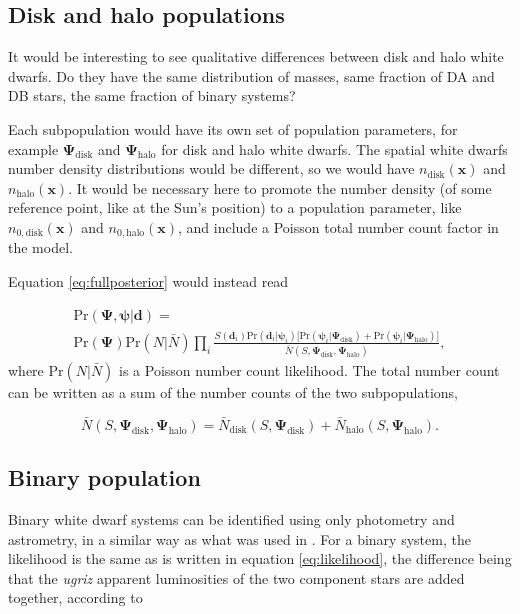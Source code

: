 \documentclass[fleqn,usenatbib]{mnras}
\newcommand{\popp}{\boldsymbol{\Psi}}
\newcommand{\objp}{\boldsymbol{\psi}}
\newcommand{\data}{\mathbf{d}}
\newcommand{\pr}{\text{Pr}}
\begin{document}
\subsection{Disk and halo populations}

It would be interesting to see qualitative differences between disk and halo white dwarfs. Do they have the same distribution of masses, same fraction of DA and DB stars, the same fraction of binary systems?

Each subpopulation would have its own set of population parameters, for example $\popp_\text{disk}$ and $\popp_\text{halo}$ for disk and halo white dwarfs. The spatial white dwarfs number density distributions would be different, so we would have $n_\text{disk}(\mathbf{x})$ and $n_\text{halo}(\mathbf{x})$. It would be necessary here to promote the number density (of some reference point, like at the Sun's position) to a population parameter, like $n_{0,\text{disk}}(\mathbf{x})$ and $n_{0,\text{halo}}(\mathbf{x})$, and include a Poisson total number count factor in the model.

Equation \eqref{eq:fullposterior} would instead read

\begin{equation}\label{eq:posterior_disk_halo}
\begin{split}
	\pr(\popp,\objp | \data ) = \\ \pr(\popp) \pr(N | \bar{N}) 
	\prod_i \frac{S(\data_i) \pr(\data_i | \objp_i) \Big[ \pr(\objp_i | \popp_\text{disk})+\pr(\objp_i | \popp_\text{halo}) \Big]}{\bar{N}(S,\popp_\text{disk},\popp_\text{halo})},
\end{split}
\end{equation}
where $\pr(N | \bar{N})$ is a Poisson number count likelihood. The total number count can be written as a sum of the number counts of the two subpopulations,

\begin{equation}
	\bar{N}(S,\popp_\text{disk},\popp_\text{halo})=\bar{N}_\text{disk}(S,\popp_\text{disk})+\bar{N}_\text{halo}(S,\popp_\text{halo}).
\end{equation}







\subsection{Binary population}

Binary white dwarf systems can be identified using only photometry and astrometry, in a similar way as what was used in \cite{2018arXiv180108547W}. For a binary system, the likelihood is the same as is written in equation \eqref{eq:likelihood}, the difference being that the \emph{ugriz} apparent luminosities of the two component stars are added together, according to
\end{document}

